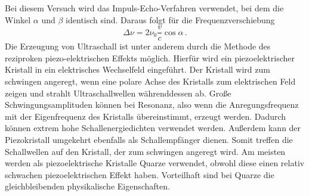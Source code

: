 Bei diesem Versuch wird das Impuls-Echo-Verfahren verwendet, bei dem die Winkel $\alpha$ und $\beta$ identisch sind. Daraus folgt für die
Frequenzverschiebung
\begin{equation}
    \Delta \nu = 2 \nu_0 \frac{v}{c}\cos \alpha \,.
    \label{eqn:Frequenzverschiebung_identisch}
\end{equation}
Die Erzeugung von Ultraschall ist unter anderem durch die Methode des reziproken piezo-elektrischen Effekts möglich. Hierfür wird ein piezoelektrischer Kristall in ein 
elektrisches Wechselfeld eingeführt. Der Kristall wird zum schwingen angeregt, wenn eine polare Achse des Kristalls zum elektrischen Feld zeigen und strahlt Ultraschallwellen währenddessen ab. 
Große Schwingungsamplituden können bei Resonanz, also wenn die Anregungsfrequenz mit der Eigenfrequenz des Kristalls übereinstimmt, erzeugt werden. Dadurch können extrem hohe Schallenergiedichten 
verwendet werden. Außerdem kann der Piezokristall umgekehrt ebenfalls als Schallempfänger dienen. Somit treffen die Schallwellen auf den Kristall, der zum schwingen angeregt wird. Am meisten werden 
als piezoelektrische Kristalle Quarze verwendet, obwohl diese einen relativ schwachen piezoelektrischen Effekt haben. Vorteilhaft sind bei Quarze die gleichbleibenden physikalische Eigenschaften. 

